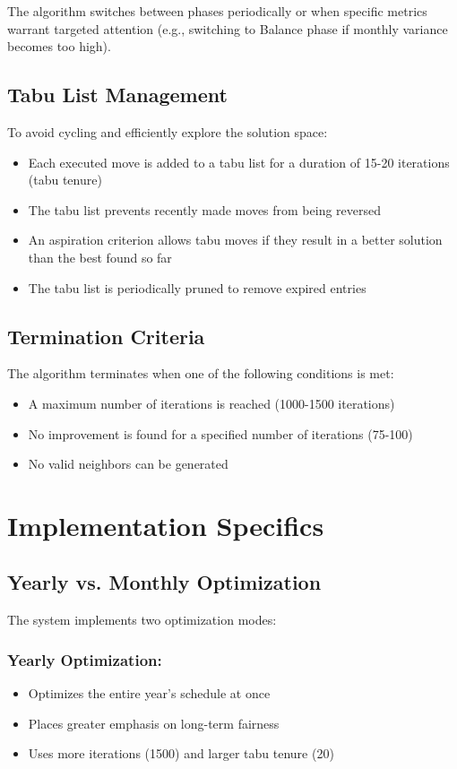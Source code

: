\documentclass[12pt]{article}
\begin{document}
The algorithm switches between phases periodically or when specific metrics warrant targeted attention (e.g., switching to Balance phase if monthly variance becomes too high).

\subsection{Tabu List Management}

To avoid cycling and efficiently explore the solution space:
\begin{itemize}
    \item Each executed move is added to a tabu list for a duration of 15-20 iterations (tabu tenure)
    \item The tabu list prevents recently made moves from being reversed
    \item An aspiration criterion allows tabu moves if they result in a better solution than the best found so far
    \item The tabu list is periodically pruned to remove expired entries
\end{itemize}

\subsection{Termination Criteria}

The algorithm terminates when one of the following conditions is met:
\begin{itemize}
    \item A maximum number of iterations is reached (1000-1500 iterations)
    \item No improvement is found for a specified number of iterations (75-100)
    \item No valid neighbors can be generated
\end{itemize}

\section{Implementation Specifics}

\subsection{Yearly vs. Monthly Optimization}

The system implements two optimization modes:

\subsubsection{Yearly Optimization:}
\begin{itemize}
    \item Optimizes the entire year's schedule at once
    \item Places greater emphasis on long-term fairness
    \item Uses more iterations (1500) and larger tabu tenure (20)
\end{itemize}
\end{document}
